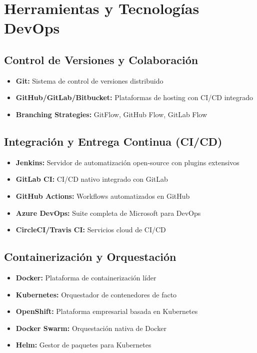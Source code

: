 \documentclass[12pt,a4paper]{article}
\begin{document}
\section{Herramientas y Tecnologías DevOps}

\subsection{Control de Versiones y Colaboración}
\begin{itemize}
    \item \textbf{Git:} Sistema de control de versiones distribuido
    \item \textbf{GitHub/GitLab/Bitbucket:} Plataformas de hosting con CI/CD integrado
    \item \textbf{Branching Strategies:} GitFlow, GitHub Flow, GitLab Flow
\end{itemize}

\subsection{Integración y Entrega Continua (CI/CD)}
\begin{itemize}
    \item \textbf{Jenkins:} Servidor de automatización open-source con plugins extensivos
    \item \textbf{GitLab CI:} CI/CD nativo integrado con GitLab
    \item \textbf{GitHub Actions:} Workflows automatizados en GitHub
    \item \textbf{Azure DevOps:} Suite completa de Microsoft para DevOps
    \item \textbf{CircleCI/Travis CI:} Servicios cloud de CI/CD
\end{itemize}

\subsection{Containerización y Orquestación}
\begin{itemize}
    \item \textbf{Docker:} Plataforma de containerización líder
    \item \textbf{Kubernetes:} Orquestador de contenedores de facto
    \item \textbf{OpenShift:} Plataforma empresarial basada en Kubernetes
    \item \textbf{Docker Swarm:} Orquestación nativa de Docker
    \item \textbf{Helm:} Gestor de paquetes para Kubernetes
\end{itemize}
\end{document}
